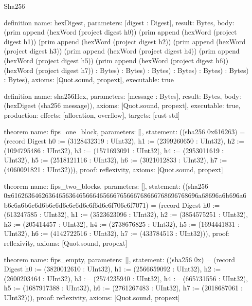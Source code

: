 \begin{lexlean}{Sha256}
\begin{semanticmodule}
definition{
  name: hexDigest,
  parameters: [digest : Digest],
  result: Bytes,
  body: (prim append (hexWord (project digest h0)) (prim append (hexWord (project digest h1)) (prim append (hexWord (project digest h2)) (prim append (hexWord (project digest h3)) (prim append (hexWord (project digest h4)) (prim append (hexWord (project digest h5)) (prim append (hexWord (project digest h6)) (hexWord (project digest h7)) : Bytes) : Bytes) : Bytes) : Bytes) : Bytes) : Bytes) : Bytes),
  axioms: [Quot.sound, propext],
  executable: true
}

definition{
  name: sha256Hex,
  parameters: [message : Bytes],
  result: Bytes,
  body: (hexDigest (sha256 message)),
  axioms: [Quot.sound, propext],
  executable: true,
  production: {effects: [allocation, overflow], targets: [rust-std]}
}

theorem{
  name: fips_one_block,
  parameters: [],
  statement: ((sha256 0x616263) = (record Digest {h0 := (3128432319 : UInt32), h1 := (2399260650 : UInt32), h2 := (1094795486 : UInt32), h3 := (1571693091 : UInt32), h4 := (2953011619 : UInt32), h5 := (2518121116 : UInt32), h6 := (3021012833 : UInt32), h7 := (4060091821 : UInt32)})),
  proof: reflexivity{},
  axioms: [Quot.sound, propext]
}

theorem{
  name: fips_two_blocks,
  parameters: [],
  statement: ((sha256 0x6162636462636465636465666465666765666768666768696768696a68696a6b696a6b6c6a6b6c6d6b6c6d6e6c6d6e6f6d6e6f706e6f7071) = (record Digest {h0 := (613247585 : UInt32), h1 := (3523623096 : UInt32), h2 := (3854575251 : UInt32), h3 := (205414457 : UInt32), h4 := (2738676825 : UInt32), h5 := (1694441831 : UInt32), h6 := (4142722516 : UInt32), h7 := (433784513 : UInt32)})),
  proof: reflexivity{},
  axioms: [Quot.sound, propext]
}

theorem{
  name: fips_empty,
  parameters: [],
  statement: ((sha256 0x) = (record Digest {h0 := (3820012610 : UInt32), h1 := (2566659092 : UInt32), h2 := (2600203464 : UInt32), h3 := (2574235940 : UInt32), h4 := (665731556 : UInt32), h5 := (1687917388 : UInt32), h6 := (2761267483 : UInt32), h7 := (2018687061 : UInt32)})),
  proof: reflexivity{},
  axioms: [Quot.sound, propext]
}
\end{semanticmodule}
\end{lexlean}
